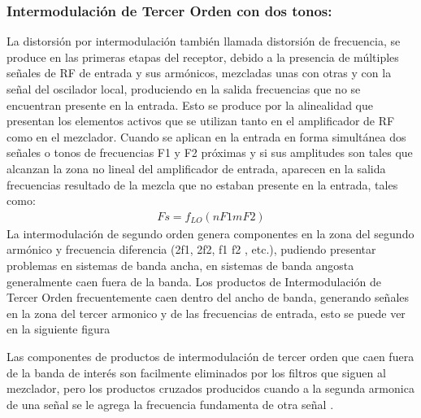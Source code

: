 \documentclass[a4paper,10pt,spanish]{report}
\let\sphinxpxdimen\pdfpxdimen\else\newdimen\sphinxpxdimen
\begin{document}
\sphinxincludegraphics[width=1791\sphinxpxdimen,height=834\sphinxpxdimen]{{linealidad1}.png}


\subsubsection{Intermodulación de Tercer Orden con dos tonos:}
\label{\detokenize{introduccion/sistemas:Intermodulaci_xf3n-de-Tercer-Orden-con-dos-tonos:}}
La distorsión por intermodulación también llamada distorsión de frecuencia, se produce en las primeras etapas del receptor, debido a la presencia de múltiples señales de RF de entrada y sus armónicos, mezcladas unas con otras y con la señal del oscilador local, produciendo en la salida frecuencias que no se encuentran presente en la entrada. Esto se produce por la alinealidad que presentan los elementos activos que se utilizan tanto en el amplificador de RF como en el mezclador. Cuando se
aplican en la entrada en forma simultánea dos señales o tonos de frecuencias F1 y F2 próximas y si sus amplitudes son tales que alcanzan la zona no lineal del amplificador de entrada, aparecen en la salida frecuencias resultado de la mezcla que no estaban presente en la entrada, tales como:
\begin{equation*}
\begin{split}Fs  =  f_{LO} ( nF1 mF2)\end{split}
\end{equation*}
La intermodulación de segundo orden genera componentes en la zona del segundo armónico y frecuencia diferencia (2f1, 2f2, f1 f2 , etc.), pudiendo presentar problemas en sistemas de banda ancha, en sistemas de banda angosta generalmente caen fuera de la banda. Los productos de Intermodulación de Tercer Orden frecuentemente caen dentro del ancho de banda, generando señales en la zona del tercer armonico y de las frecuencias de entrada, esto se puede ver en la siguiente figura

Las componentes de productos de intermodulación de tercer orden que caen fuera de la banda de interés son facilmente eliminados por los filtros que siguen al mezclador, pero los productos cruzados producidos cuando a la segunda armonica de una señal se le agrega la frecuencia fundamenta de otra señal .
\end{document}
